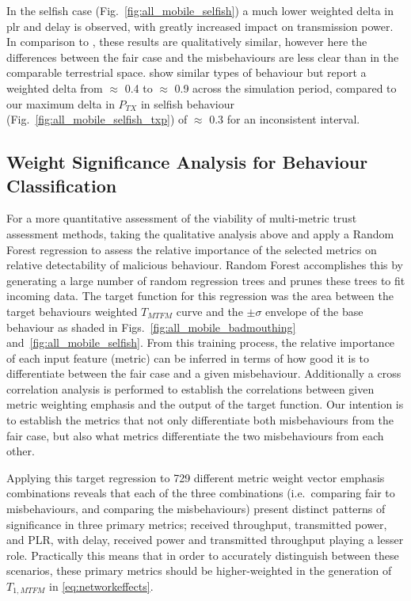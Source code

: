 In the selfish case (Fig.~\ref{fig:all_mobile_selfish}) a much lower weighted delta in \gls{plr} and delay is observed, with greatly increased impact on transmission power.
In comparison to \cite{Guo11}, these results are qualitatively similar, however here the differences between the fair case and the misbehaviours are less clear than in the comparable terrestrial space.
\citet{Guo11} show similar types of behaviour but report a weighted delta from $\approx$ 0.4 to $\approx$ 0.9 across the simulation period, compared to our maximum delta in $P_{TX}$ in selfish behaviour (Fig.~\ref{fig:all_mobile_selfish_txp}) of $\approx$ 0.3 for an inconsistent interval.

\subsection{Weight Significance Analysis for Behaviour Classification}

For a more quantitative assessment of the viability of multi-metric trust assessment methods, taking the qualitative analysis above and apply a Random Forest regression \cite{Breiman2001} to assess the relative importance of the selected metrics on relative detectability of malicious behaviour. 
Random Forest accomplishes this by generating a large number of random regression trees and prunes these trees to fit incoming data.
The target function for this regression was the area between the target behaviours weighted $T_{MTFM}$ curve and the $\pm\sigma$ envelope of the base behaviour as shaded in Figs.~\ref{fig:all_mobile_badmouthing} and~\ref{fig:all_mobile_selfish}.
From this training process, the relative importance of each input feature (metric) can be inferred in terms of how good it is to differentiate between the fair case and a given misbehaviour.
Additionally a cross correlation analysis is performed to establish the correlations between given metric weighting emphasis and the output of the target function.
Our intention is to establish the metrics that not only differentiate both misbehaviours from the fair case, but also what metrics differentiate the two misbehaviours from each other.

Applying this target regression to 729 different metric weight vector emphasis combinations reveals that each of the three combinations (i.e.\ comparing fair to misbehaviours, and comparing the misbehaviours) present distinct patterns of significance in three primary metrics; received throughput, transmitted power, and PLR, with delay, received power and transmitted throughput playing a lesser role.
Practically this means that in order to accurately distinguish between these scenarios, these primary metrics should be higher-weighted in the generation of $T_{1,MTFM}$ in \eqref{eq:networkeffects}.

